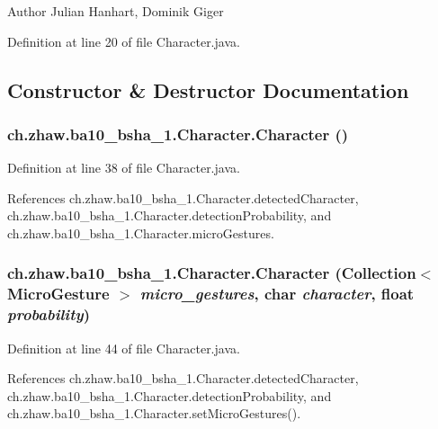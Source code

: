 \begin{DoxyAuthor}{Author}
Julian Hanhart, Dominik Giger 
\end{DoxyAuthor}


Definition at line 20 of file Character.java.

\subsection{Constructor \& Destructor Documentation}
\hypertarget{classch_1_1zhaw_1_1ba10__bsha__1_1_1Character_a4767949d8c182759546593cedbfa2fca}{
\subsubsection[{Character}]{\setlength{\rightskip}{0pt plus 5cm}ch.zhaw.ba10\_\-bsha\_\-1.Character.Character ()}}
\label{classch_1_1zhaw_1_1ba10__bsha__1_1_1Character_a4767949d8c182759546593cedbfa2fca}


Definition at line 38 of file Character.java.

References ch.zhaw.ba10\_\-bsha\_\-1.Character.detectedCharacter, ch.zhaw.ba10\_\-bsha\_\-1.Character.detectionProbability, and ch.zhaw.ba10\_\-bsha\_\-1.Character.microGestures.\hypertarget{classch_1_1zhaw_1_1ba10__bsha__1_1_1Character_a7de6941f30f53be346af22a76e8dd455}{
\subsubsection[{Character}]{\setlength{\rightskip}{0pt plus 5cm}ch.zhaw.ba10\_\-bsha\_\-1.Character.Character (Collection$<$ {\bf MicroGesture} $>$ {\em micro\_\-gestures}, \/  char {\em character}, \/  float {\em probability})}}
\label{classch_1_1zhaw_1_1ba10__bsha__1_1_1Character_a7de6941f30f53be346af22a76e8dd455}


Definition at line 44 of file Character.java.

References ch.zhaw.ba10\_\-bsha\_\-1.Character.detectedCharacter, ch.zhaw.ba10\_\-bsha\_\-1.Character.detectionProbability, and ch.zhaw.ba10\_\-bsha\_\-1.Character.setMicroGestures().

